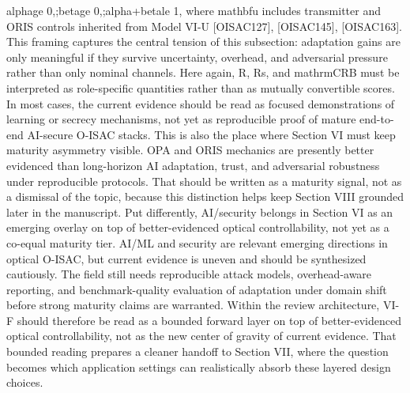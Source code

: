 {}\markdownRendererDollarSign{}\markdownRendererDollarSign{}\markdownRendererSoftLineBreak
{}\markdownRendererDollarSign{}\markdownRendererDollarSign{}\markdownRendererSoftLineBreak
{}\markdownRendererBackslash{}alpha\markdownRendererBackslash{}ge 0,;\markdownRendererBackslash{}beta\markdownRendererBackslash{}ge 0,;\markdownRendererBackslash{}alpha+\markdownRendererBackslash{}beta\markdownRendererBackslash{}le 1,\markdownRendererSoftLineBreak
{}\markdownRendererDollarSign{}\markdownRendererDollarSign{}\markdownRendererParagraphSeparator
{}where \markdownRendererDollarSign{}\markdownRendererBackslash{}mathbf\markdownRendererLeftBrace{}u\markdownRendererRightBrace{}\markdownRendererDollarSign{} includes transmitter and ORIS controls inherited from Model VI-U [O\markdownRendererUnderscore{}ISAC\markdownRendererUnderscore{}127], [O\markdownRendererUnderscore{}ISAC\markdownRendererUnderscore{}145], [O\markdownRendererUnderscore{}ISAC\markdownRendererUnderscore{}163]. This framing captures the central tension of this subsection: adaptation gains are only meaningful if they survive uncertainty, overhead, and adversarial pressure rather than only nominal channels. Here again, \markdownRendererDollarSign{}R\markdownRendererDollarSign{}, \markdownRendererDollarSign{}R\markdownRendererUnderscore{}s\markdownRendererDollarSign{}, and \markdownRendererDollarSign{}\markdownRendererBackslash{}mathrm\markdownRendererLeftBrace{}CRB\markdownRendererRightBrace{}\markdownRendererDollarSign{} must be interpreted as role-specific quantities rather than as mutually convertible scores. In most cases, the current evidence should be read as focused demonstrations of learning or secrecy mechanisms, not yet as reproducible proof of mature end-to-end AI-secure O-ISAC stacks.\markdownRendererParagraphSeparator
{}This is also the place where Section VI must keep maturity asymmetry visible. OPA and ORIS mechanics are presently better evidenced than long-horizon AI adaptation, trust, and adversarial robustness under reproducible protocols. That should be written as a maturity signal, not as a dismissal of the topic, because this distinction helps keep Section VIII grounded later in the manuscript. Put differently, AI/security belongs in Section VI as an emerging overlay on top of better-evidenced optical controllability, not yet as a co-equal maturity tier.\markdownRendererParagraphSeparator
{} AI/ML and security are relevant emerging directions in optical O-ISAC, but current evidence is uneven and should be synthesized cautiously. The field still needs reproducible attack models, overhead-aware reporting, and benchmark-quality evaluation of adaptation under domain shift before strong maturity claims are warranted. Within the review architecture, VI-F should therefore be read as a bounded forward layer on top of better-evidenced optical controllability, not as the new center of gravity of current evidence. That bounded reading prepares a cleaner handoff to Section VII, where the question becomes which application settings can realistically absorb these layered design choices.\markdownRendererInterblockSeparator
